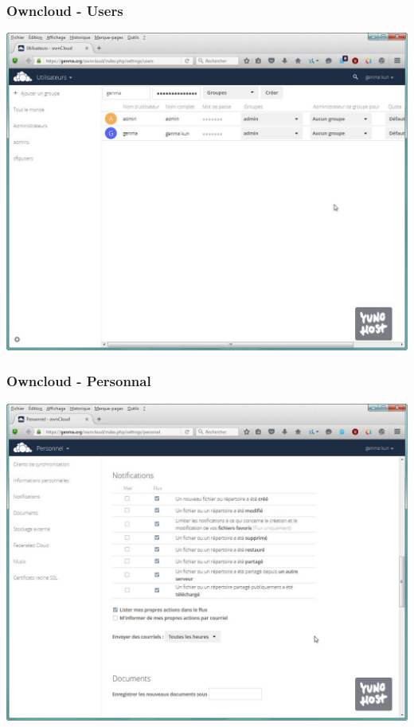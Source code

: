 \documentclass{beamer}
\begin{document}
\begin{frame}
\frametitle{Owncloud - Users}
\includegraphics[scale=0.4] {./Owncloud/Owncloud_Utilisateurs.jpg}
\end{frame}

\begin{frame}
\frametitle{Owncloud - Personnal}
\includegraphics[scale=0.4] {./Owncloud/Owncloud_Personnel.jpg}
\end{frame}
\end{document}
